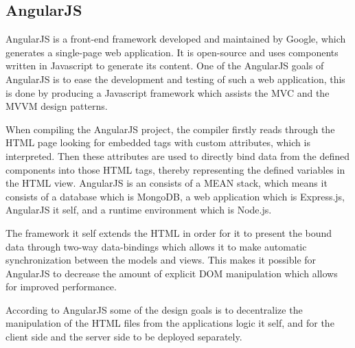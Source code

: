 \subsection{AngularJS} \label{ssec:angular}
AngularJS is a front-end framework developed and maintained by Google, which generates a single-page web application.
It is open-source and uses components written in Javascript to generate its content.
One of the AngularJS goals of AngularJS is to ease the development and testing of such a web application, this is done by producing a Javascript framework which assists the MVC and the MVVM design patterns.

When compiling the AngularJS project, the compiler firstly reads through the HTML page looking for embedded tags with custom attributes, which is interpreted.
Then these attributes are used to directly bind data from the defined components into those HTML tags, thereby representing the defined variables in the HTML view.
AngularJS is an consists of a MEAN stack, which means it consists of a database which is MongoDB, a web application which is Express.js, AngularJS it self, and a runtime environment which is Node.js.

The framework it self extends the HTML in order for it to present the bound data through two-way data-bindings which allows it to make automatic synchronization between the models and views.
This makes it possible for AngularJS to decrease the amount of explicit DOM manipulation which allows for improved performance.

According to AngularJS some of the design goals is to decentralize the manipulation of the HTML files from the applications logic it self, and for the client side and the server side to be deployed separately.
